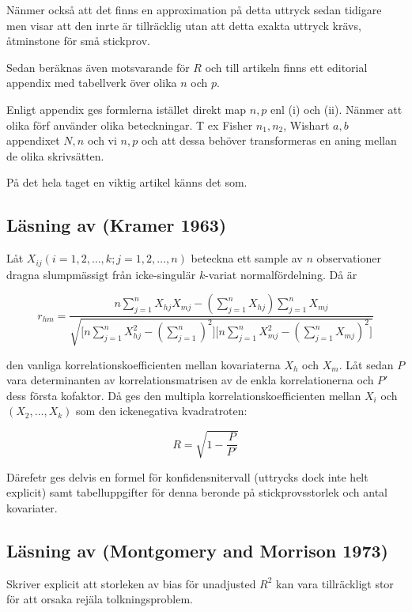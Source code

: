 \documentclass[]{article}
\begin{document}
Nänmer också att det finns en approximation på detta uttryck sedan
tidigare men visar att den inrte är tillräcklig utan att detta exakta
uttryck krävs, åtminstone för små stickprov.

Sedan beräknas även motsvarande för \(R\) och till artikeln finns ett
editorial appendix med tabellverk över olika \(n\) och \(p\).

Enligt appendix ges formlerna istället direkt map \(n, p\) enl (i) och
(ii). Nänmer att olika förf använder olika beteckningar. T ex Fisher
\(n_1, n_2\), Wishart \(a, b\) appendixet \(N, n\) och vi \(n, p\) och
att dessa behöver transformeras en aning mellan de olika skrivsätten.

På det hela taget en viktig artikel känns det som.

\subsection{Läsning av (Kramer 1963)}\label{lasning-av-kramer1963}

Låt \(X_{ij} (i = 1, 2, \ldots, k; j = 1, 2, \ldots, n)\) beteckna ett
sample av \(n\) observationer dragna slumpmässigt från icke-singulär
\(k\)-variat normalfördelning. Då är

\[r_{hm} = \frac{n\sum_{j = 1}^n X_{hj}X_{mj}-(\sum_{j = 1}^nX_{hj}) \sum_{j = 1}^nX_{mj}}{
\sqrt{
   \big[
       n 
       \sum_{j = 1}^n
       X_{hj}^2-
       (\sum_{j = 1}^n)^2
    \big]
    \big[
      n
      \sum_{j = 1}^n X_{mj}^2 - 
      (\sum_{j=1}^n X_{mj})^2
    \big] 
  }
}\]

den vanliga korrelationskoefficienten mellan kovariaterna \(X_h\) och
\(X_m\). Låt sedan \(P\) vara determinanten av korrelationsmatrisen av
de enkla korrelationerna och \(P'\) dess första kofaktor. Då ges den
multipla korrelationskoefficienten mellan \(X_i\) och
\((X_2, \ldots, X_k)\) som den ickenegativa kvadratroten:

\[R = \sqrt{1 - \frac{P}{P'}}\]

Därefetr ges delvis en formel för konfidensnitervall (uttrycks dock inte
helt explicit) samt tabelluppgifter för denna beronde på
stickprovsstorlek och antal kovariater.

\subsection{Läsning av (Montgomery and Morrison
1973)}\label{lasning-av-montgomery1973}

Skriver explicit att storleken av bias för unadjusted \(R^2\) kan vara
tillräckligt stor för att orsaka rejäla tolkningsproblem.
\end{document}
